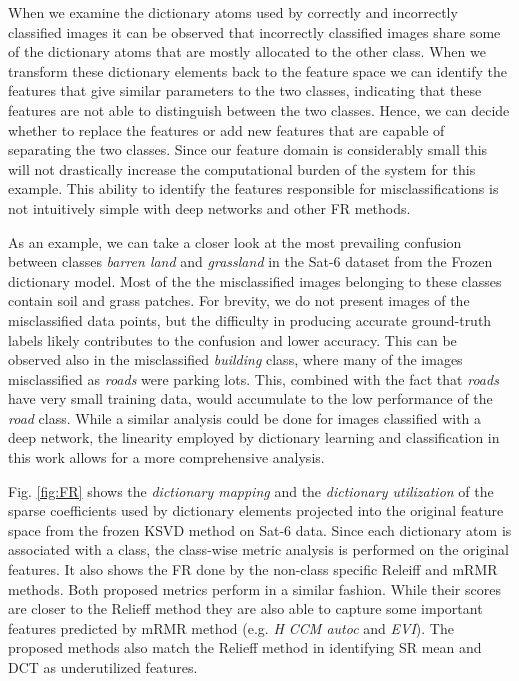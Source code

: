 When we examine the dictionary atoms used by correctly and incorrectly classified images it can be observed that incorrectly classified images share some of the dictionary atoms that are mostly allocated to the other class. When we transform these dictionary elements back to the feature space we can identify the features that give similar parameters to the two classes, indicating that these features are not able to distinguish between the two classes. Hence, we can decide whether to replace the features or add new features that are capable of separating the two classes. Since our feature domain is considerably small this will not drastically increase the computational burden of the system for this example. This ability to identify the features responsible for misclassifications is not intuitively simple with deep networks and other FR methods. 

As an example, we can take a closer look at the most prevailing confusion between classes \textit{barren land} and \textit{grassland} in the Sat-6 dataset from the Frozen dictionary model. Most of the the misclassified images belonging to these classes contain soil and grass patches. For brevity, we do not present images of the misclassified data points, but the difficulty in producing accurate ground-truth labels likely contributes to the confusion and lower accuracy. This can be observed also in the misclassified \textit{building} class, where many of the images misclassified as \textit{roads} were parking lots. This, combined with the fact that \textit{roads} have very small training data, would accumulate to the low performance of the \textit{road} class. While a similar analysis could be done for images classified with a deep network, the linearity employed by dictionary learning and classification in this work allows for a more comprehensive analysis. 

Fig. \ref{fig:FR} shows the \textit{dictionary mapping} and the \textit{dictionary utilization} of the sparse coefficients used by dictionary elements projected into the original feature space from the frozen KSVD method on Sat-6 data. Since each dictionary atom is associated with a class, the class-wise metric analysis is performed on the original features. It also shows the FR done by the non-class specific Releiff and mRMR methods. Both proposed metrics perform in a similar fashion. While their scores are closer to the Relieff method they are also able to capture some important features predicted by mRMR method (e.g. \textit{H CCM autoc} and \textit{EVI}). The proposed methods also match the Relieff method in identifying SR mean and DCT as underutilized features.

